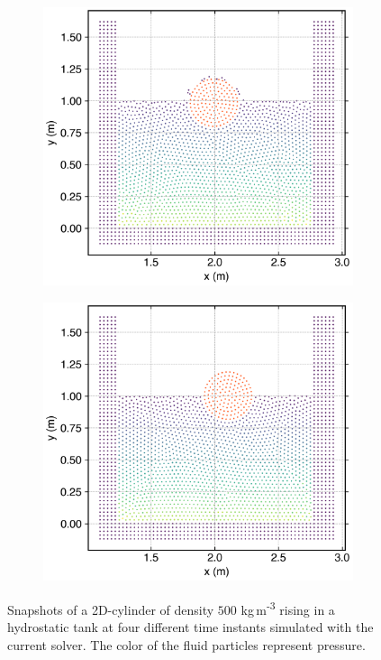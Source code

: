 \begin{figure}[!htpb]
  \begin{subfigure}{0.48\textwidth}
    \centering
    \includegraphics[width=1.0\textwidth]{figures/rfc/figures/dinesh_2022_body_in_hs_tank_2d/time6}
  \end{subfigure}
  \begin{subfigure}{0.48\textwidth}
    \centering
    \includegraphics[width=1.0\textwidth]{figures/rfc/figures/dinesh_2022_body_in_hs_tank_2d/time11}
  \end{subfigure}
  \caption{Snapshots of a 2D-cylinder of density $500$ kg\,m\textsuperscript{-3}
    rising in a hydrostatic tank at four different time instants simulated
    with the current solver. The color of the fluid particles represent pressure.}
\label{fig:snapshots-rising-solid-in-water}
\end{figure}
